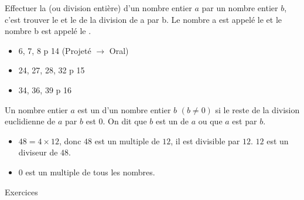 \documentclass[12pt,a4paper]{article}
\begin{document}
\begin{mybilan}
	Effectuer la  (ou division entière) d’un nombre entier $a$ par un nombre entier $b$, c’est trouver le  et le  de la division de a par b.
	Le nombre a est appelé le  et le nombre b est appelé le .
	
\end{mybilan}

\begin{myexos}
	\begin{itemize}
		\item 6, 7, 8 p 14 (Projeté $\rightarrow$ Oral)
		\item 24, 27, 28, 32 p 15
		\item 34, 36, 39 p 16
	\end{itemize}
	
\end{myexos}


\begin{mydef}
	Un nombre entier $a$ est un  d'un nombre entier $b$ $(b \neq 0)$ si le reste de la division euclidienne de $a$ par $b$ est $0$.
	On dit que $b$ est un  de $a$ ou que $a$ est  par $b$. 
\end{mydef}

\begin{myexs}
	\begin{itemize}
		\item $48 = 4 \times 12$, donc $48$ est un multiple de $12$, il est divisible par $12$. $12$ est un diviseur de $48$.
		
		\item 0 est un multiple de tous les nombres.
		
	\end{itemize}
\end{myexs}

\begin{myexos}
	Exercices 
\end{myexos}
\end{document}
